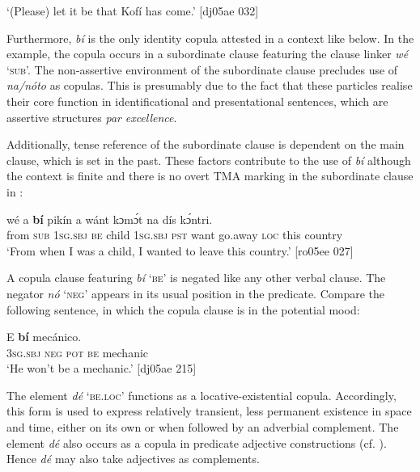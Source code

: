 \glt ‘(Please) let it be that Kofí has come.’ [dj05ae 032]
\z

Furthermore, \textit{bí} is the only identity copula attested in a context like  below. In the example, the copula occurs in a subordinate clause featuring the clause linker \textit{wé} ‘\textsc{sub}’. The non-assertive environment of the subordinate clause precludes use of \textit{na}\textit{\textup{/}}\textit{nóto} as copulas. This is presumably due to the fact that these particles realise their core function in identificational and presentational sentences, which are assertive structures \textit{par} \textit{excellence}. 


Additionally, tense reference of the subordinate clause is dependent on the main clause, which is set in the past. These factors contribute to the use of \textit{bí} although the context is finite and there is no overt TMA marking in the subordinate clause in :



\ea%
    \label{ex:key:777}
    \gll {}  wé  a    \textbf{bí}  pikín  a      wánt
kɔmɔ́t  na  dís  kɔ́ntri.\\
from  \textsc{sub}  \textsc{1sg.sbj}  \textsc{be}  child  \textsc{1sg.sbj}  \textsc{pst}  want
go.away  \textsc{loc}  this  country\\

\glt ‘From when I was a child, I wanted to leave this country.’ [ro05ee 027]
\z

A copula clause featuring \textit{bí} ‘\textsc{be’} is negated like any other verbal clause. The negator \textit{nó} ‘\textsc{neg}’ appears in its usual position in the predicate. Compare the following sentence, in which the copula clause is in the potential mood:


\ea%
    \label{ex:key:778}
    \gll E        \textbf{bí}  mecánico.\\
\textsc{3sg.sbj}  \textsc{neg}  \textsc{pot}  \textsc{be}  mechanic\\

\glt ‘He won’t be a mechanic.’ [dj05ae 215]
\z

The element \textit{dé} \textsc{‘be.loc’} functions as a locative-existential copula. Accordingly, this form is used to express relatively transient, less permanent existence in space and time, either on its own or when followed by an adverbial complement. The element \textit{dé} also occurs as a copula in predicate adjective constructions (cf. ). Hence \textit{dé} may also take adjectives as complements. 


